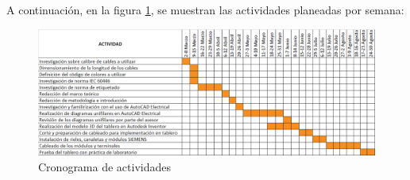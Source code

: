 A continuación, en la figura \ref{fig:crono}, se muestran las actividades planeadas por semana:


\begin{figure}[ht]
\centering
\includegraphics[width=15cm]{Cronograma.png}
\caption{Cronograma de actividades}
\label{fig:crono}
\end{figure}
